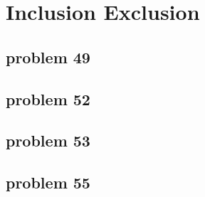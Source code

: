 \section{Inclusion Exclusion}

\subsection{problem 49}


\subsection{problem 52}


\subsection{problem 53}


\subsection{problem 55}

